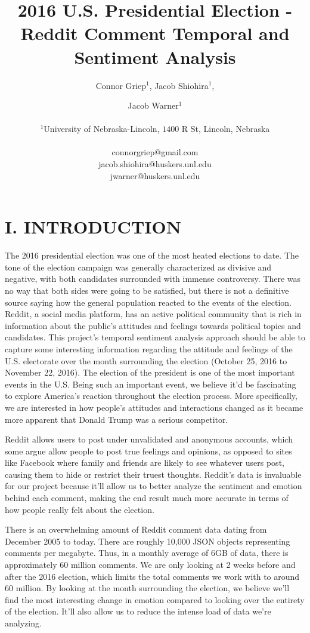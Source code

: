 \documentclass[letterpaper]{article}
\title{2016 U.S. Presidential Election - Reddit Comment Temporal and Sentiment Analysis}
\author{Connor Griep$^{1}$, Jacob Shiohira$^{1}$, \and Jacob Warner$^{1}$ \\
\mbox{}\\
$^1$University of Nebraska-Lincoln, $1400$ R St, Lincoln, Nebraska \\
\mbox{}\\
connorgriep@gmail.com \\
jacob.shiohira@huskers.unl.edu \\
jwarner@huskers.unl.edu }
\begin{document}
\maketitle

\section{I. INTRODUCTION}

The 2016 presidential election was one of the most heated elections to date. The tone of the election campaign was generally characterized as divisive and negative, with both candidates surrounded with immense controversy. There was no way that both sides were going to be satisfied, but there is not a definitive source saying how the general population reacted to the events of the election. Reddit, a social media platform, has an active political community that is rich in information about the public's attitudes and feelings towards political topics and candidates. This project’s temporal sentiment analysis approach should be able to capture some interesting information regarding the attitude and feelings of the U.S. electorate over the month surrounding the election (October 25, 2016 to November 22, 2016). The election of the president is one of the most important events in the U.S. Being such an important event, we believe it’d be fascinating to explore America’s reaction throughout the election process. More specifically, we are interested in how people’s attitudes and interactions changed as it became more apparent that Donald Trump was a serious competitor.

Reddit allows users to post under unvalidated and anonymous accounts, which some argue allow people to post true feelings and opinions, as opposed to sites like Facebook where family and friends are likely to see whatever users post, causing them to hide or restrict their truest thoughts. Reddit’s data is invaluable for our project because it’ll allow us to better analyze the sentiment and emotion behind each comment, making the end result much more accurate in terms of how people really felt about the election.

There is an overwhelming amount of Reddit comment data dating from December 2005 to today. There are roughly 10,000 JSON objects representing comments per megabyte. Thus, in a monthly average of 6GB of data, there is approximately 60 million comments. We are only looking at 2 weeks before and after the 2016 election, which limits the total comments we work with to around 60 million. By looking at the month surrounding the election, we believe we’ll find the most interesting change in emotion compared to looking over the entirety of the election. It’ll also allow us to reduce the intense load of data we’re analyzing.
\end{document}
